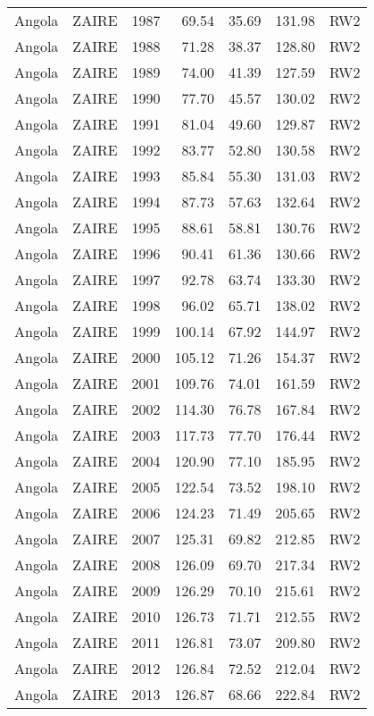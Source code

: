 \begin{longtable}{lllrrrl}
  Angola & ZAIRE & 1987 & 69.54 & 35.69 & 131.98 & RW2 \\ 
  Angola & ZAIRE & 1988 & 71.28 & 38.37 & 128.80 & RW2 \\ 
  Angola & ZAIRE & 1989 & 74.00 & 41.39 & 127.59 & RW2 \\ 
  Angola & ZAIRE & 1990 & 77.70 & 45.57 & 130.02 & RW2 \\ 
  Angola & ZAIRE & 1991 & 81.04 & 49.60 & 129.87 & RW2 \\ 
  Angola & ZAIRE & 1992 & 83.77 & 52.80 & 130.58 & RW2 \\ 
  Angola & ZAIRE & 1993 & 85.84 & 55.30 & 131.03 & RW2 \\ 
  Angola & ZAIRE & 1994 & 87.73 & 57.63 & 132.64 & RW2 \\ 
  Angola & ZAIRE & 1995 & 88.61 & 58.81 & 130.76 & RW2 \\ 
  Angola & ZAIRE & 1996 & 90.41 & 61.36 & 130.66 & RW2 \\ 
  Angola & ZAIRE & 1997 & 92.78 & 63.74 & 133.30 & RW2 \\ 
  Angola & ZAIRE & 1998 & 96.02 & 65.71 & 138.02 & RW2 \\ 
  Angola & ZAIRE & 1999 & 100.14 & 67.92 & 144.97 & RW2 \\ 
  Angola & ZAIRE & 2000 & 105.12 & 71.26 & 154.37 & RW2 \\ 
  Angola & ZAIRE & 2001 & 109.76 & 74.01 & 161.59 & RW2 \\ 
  Angola & ZAIRE & 2002 & 114.30 & 76.78 & 167.84 & RW2 \\ 
  Angola & ZAIRE & 2003 & 117.73 & 77.70 & 176.44 & RW2 \\ 
  Angola & ZAIRE & 2004 & 120.90 & 77.10 & 185.95 & RW2 \\ 
  Angola & ZAIRE & 2005 & 122.54 & 73.52 & 198.10 & RW2 \\ 
  Angola & ZAIRE & 2006 & 124.23 & 71.49 & 205.65 & RW2 \\ 
  Angola & ZAIRE & 2007 & 125.31 & 69.82 & 212.85 & RW2 \\ 
  Angola & ZAIRE & 2008 & 126.09 & 69.70 & 217.34 & RW2 \\ 
  Angola & ZAIRE & 2009 & 126.29 & 70.10 & 215.61 & RW2 \\ 
  Angola & ZAIRE & 2010 & 126.73 & 71.71 & 212.55 & RW2 \\ 
  Angola & ZAIRE & 2011 & 126.81 & 73.07 & 209.80 & RW2 \\ 
  Angola & ZAIRE & 2012 & 126.84 & 72.52 & 212.04 & RW2 \\ 
  Angola & ZAIRE & 2013 & 126.87 & 68.66 & 222.84 & RW2 \\ 

\end{longtable}
